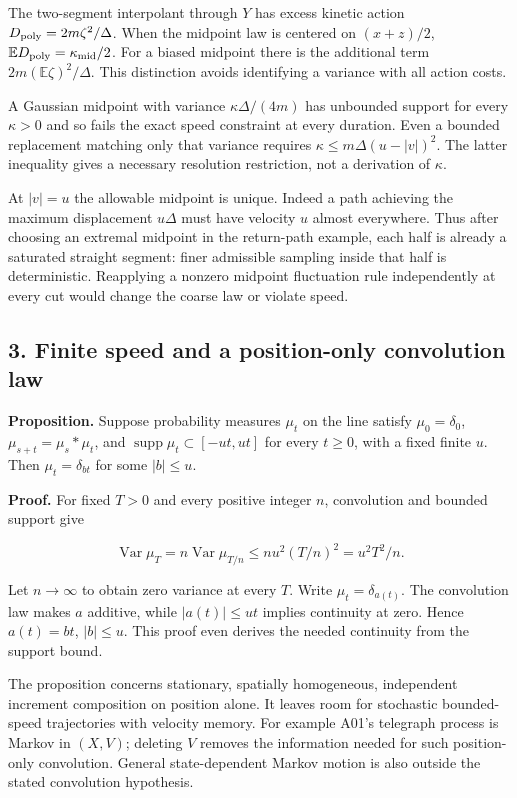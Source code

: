 \documentclass[11pt,a4paper]{article}
\begin{document}
The two-segment interpolant through \(Y\) has excess kinetic action
\(D_{\rm poly}=2m\zeta^2/\Delta\). When the midpoint law is centered on
\((x+z)/2\), \(\mathbb E D_{\rm poly}=\kappa_{\rm mid}/2\). For a biased
midpoint there is the additional term \(2m(\mathbb E\zeta)^2/\Delta\).
This distinction avoids identifying a variance with all action costs.

A Gaussian midpoint with variance \(\kappa\Delta/(4m)\) has unbounded
support for every \(\kappa>0\) and so fails the exact speed constraint
at every duration. Even a bounded replacement matching only that
variance requires \(\kappa\le m\Delta(u-|v|)^2\). The latter inequality
gives a necessary resolution restriction, not a derivation of
\(\kappa\).

At \(|v|=u\) the allowable midpoint is unique. Indeed a path achieving
the maximum displacement \(u\Delta\) must have velocity \(u\) almost
everywhere. Thus after choosing an extremal midpoint in the return-path
example, each half is already a saturated straight segment: finer
admissible sampling inside that half is deterministic. Reapplying a
nonzero midpoint fluctuation rule independently at every cut would
change the coarse law or violate speed.

\hypertarget{finite-speed-and-a-position-only-convolution-law}{%
\subsection{3. Finite speed and a position-only convolution
law}\label{finite-speed-and-a-position-only-convolution-law}}

\textbf{Proposition.} Suppose probability measures \(\mu_t\) on the line
satisfy \(\mu_0=\delta_0\), \(\mu_{s+t}=\mu_s*\mu_t\), and
\(\operatorname{supp}\mu_t\subset[-ut,ut]\) for every \(t\ge0\), with a
fixed finite \(u\). Then \(\mu_t=\delta_{bt}\) for some \(|b|\le u\).

\textbf{Proof.} For fixed \(T>0\) and every positive integer \(n\),
convolution and bounded support give

\[\operatorname{Var}\mu_T=n\operatorname{Var}\mu_{T/n}
\le n u^2(T/n)^2=u^2T^2/n.\]

Let \(n\to\infty\) to obtain zero variance at every \(T\). Write
\(\mu_t=\delta_{a(t)}\). The convolution law makes \(a\) additive, while
\(|a(t)|\le ut\) implies continuity at zero. Hence \(a(t)=bt\),
\(|b|\le u\). This proof even derives the needed continuity from the
support bound.

The proposition concerns stationary, spatially homogeneous, independent
increment composition on position alone. It leaves room for stochastic
bounded-speed trajectories with velocity memory. For example A01's
telegraph process is Markov in \((X,V)\); deleting \(V\) removes the
information needed for such position-only convolution. General
state-dependent Markov motion is also outside the stated convolution
hypothesis.
\end{document}
